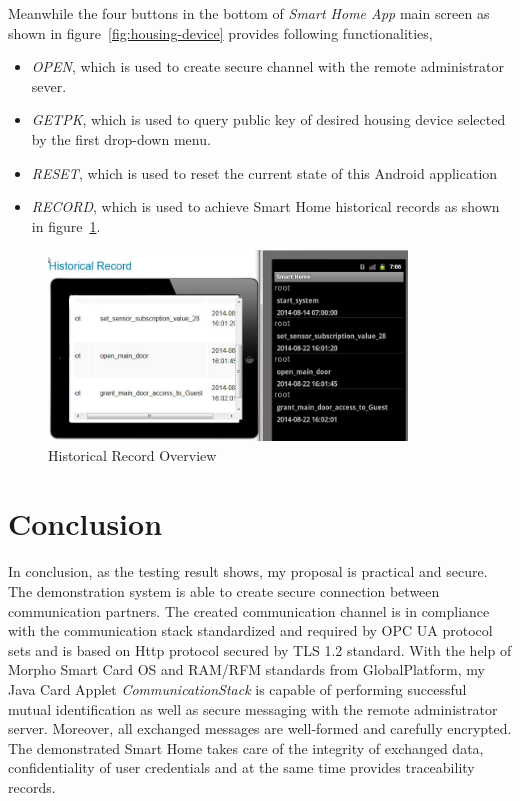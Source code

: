 Meanwhile the four buttons in the bottom of  \emph{Smart Home App} main screen as shown in figure~\ref{fig:housing-device} provides  following functionalities,
\begin{itemize}
\item \emph{OPEN}, which is used to create secure channel with  the remote administrator sever.
\item \emph{GETPK}, which is used to query public key of desired housing device selected  by the first drop-down menu.
\item \emph{RESET}, which is used to reset the current state of this Android application
\item \emph{RECORD}, which is used to achieve Smart Home historical records as shown in figure~\ref{fig:record-query}.
\end{itemize}

\begin{figure}[!htb]
	\centering
	\includegraphics[width=0.85\textwidth]{Images/impl/record-query.jpg}
		\caption{Historical Record Overview}
	\label{fig:record-query}
\end{figure}

\section{Conclusion}
In conclusion, as the testing result shows, my proposal is practical and secure. The demonstration system is able to create secure connection between communication partners. The created communication channel is in compliance with the communication stack standardized and required by OPC UA protocol sets and is based on Http protocol secured by TLS 1.2 standard. With the help of Morpho Smart Card OS and RAM/RFM standards from GlobalPlatform, my Java Card Applet \emph{CommunicationStack} is capable of performing successful mutual identification as well as secure messaging with the remote administrator server. Moreover, all exchanged messages are well-formed and carefully encrypted. The demonstrated Smart Home takes care of the integrity of exchanged data, confidentiality of user credentials and at the same time provides traceability records.